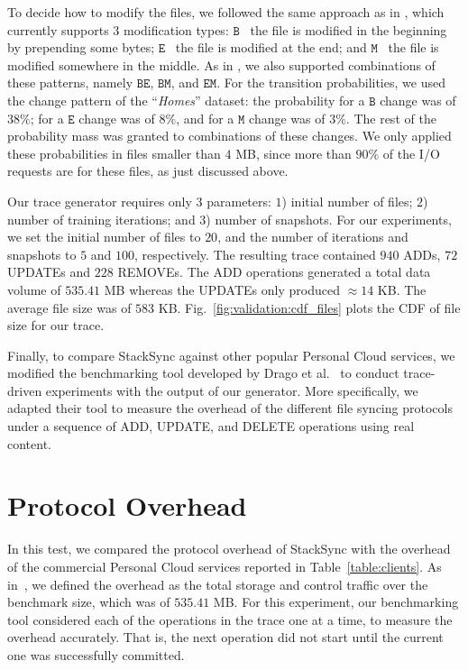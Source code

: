 To decide how to modify the files, we followed the same approach as in \cite{Tarasov12},
which currently supports $3$ modification types: $\mathtt{B}$ \textemdash~the file is modified in the
beginning by prepending some bytes; $\mathtt{E}$ \textemdash~the file is modified at the end; and $\mathtt{M}$ \textemdash~the
file is modified somewhere in the middle.  As in \cite{Tarasov12}, we also supported
combinations of these patterns, namely $\mathtt{BE}$, $\mathtt{BM}$, and $\mathtt{EM}$. For the transition 
probabilities, we used the change pattern of the ``\textit{Homes}'' dataset: the probability for a $\mathtt{B}$ 
change was of $38\%$; for a $\mathtt{E}$ change was of $8\%$, and for a $\mathtt{M}$ change was of $3\%$. 
The rest of the probability mass was granted to combinations of these changes. We only applied these probabilities
in files smaller than $4$ MB, since more than $90\%$ of the I/O requests are for these files, as just
discussed above.

Our trace generator requires only $3$ parameters: $1$) initial number of files; $2$) number
of training iterations; and $3$) number of snapshots. For our experiments, we set the
initial number of files to $20$, and the number of iterations and snapshots to $5$ and
$100$, respectively. The resulting trace contained $940$ ADDs, $72$ UPDATEs and $228$ REMOVEs.
The ADD operations generated a total data volume of $535.41$ MB whereas the UPDATEs only produced
$\approx 14$ KB. The average file size was of $583$ KB. Fig.~\ref{fig:validation:cdf_files} plots
the CDF of file size for our trace.

Finally, to compare StackSync against other popular Personal Cloud services,
we modified the benchmarking tool developed by Drago et al.~\cite{drago2013benchmarking} to
conduct trace-driven experiments with the output of our generator. More specifically, we adapted
their tool to measure the overhead of the different file syncing protocols under a sequence of
ADD, UPDATE, and DELETE operations using real content.

\section{Protocol Overhead}
In this test, we compared the protocol overhead of StackSync with the overhead of the
commercial Personal Cloud services reported in Table~\ref{table:clients}. As in~\cite{drago2013benchmarking},
we defined the overhead as the total storage and control traffic over the benchmark size, which was of 
$535.41$ MB. For this experiment, our benchmarking tool considered each of the operations in the trace one at a time,
to measure the overhead accurately. That is, the next operation did not start until the current one was
successfully committed.

